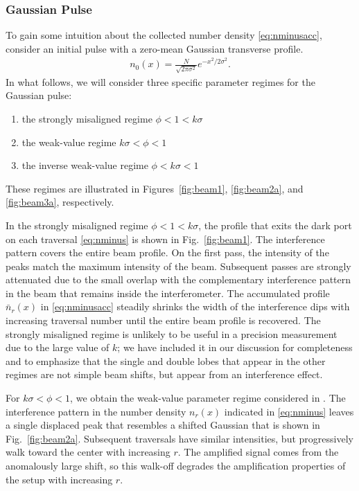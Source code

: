 \subsubsection{Gaussian Pulse}\label{sec:regimes}
To gain some intuition about the collected number density \eqref{eq:nminusacc}, consider an initial pulse with a zero-mean Gaussian transverse profile.
\begin{align}\label{eq:gaussian}
  n_0(x) = \frac{N}{\sqrt{2\pi\sigma^2}}e^{-x^2/2\sigma^2}.
\end{align}
In what follows, we will consider three specific parameter regimes for the Gaussian pulse:
\begin{enumerate}
  \item the strongly misaligned regime $\phi < 1 < k\sigma$ 
  \item the weak-value regime $k\sigma < \phi < 1$ 
  \item the inverse weak-value regime $\phi < k\sigma < 1$
\end{enumerate}
These regimes are illustrated in Figures~\ref{fig:beam1}, \ref{fig:beam2a}, and \ref{fig:beam3a}, respectively.

In the strongly misaligned regime $\phi < 1 < k\sigma$, the profile that exits the dark port on each traversal \eqref{eq:nminus} is shown in Fig.~\ref{fig:beam1}.  The interference pattern covers the entire beam profile.  On the first pass, the intensity of the peaks match the maximum intensity of the beam.  Subsequent passes are strongly attenuated due to the small overlap with the complementary interference pattern in the beam that remains inside the interferometer.  The accumulated profile $\bar{n}_r(x)$ in \eqref{eq:nminusacc} steadily shrinks the width of the interference dips with increasing traversal number until the entire beam profile is recovered.  The strongly misaligned regime is unlikely to be useful in a precision measurement due to the large value of $k$; we have included it in our discussion for completeness and to emphasize that the single and double lobes that appear in the other regimes are not simple beam shifts, but appear from an interference effect.

For $k\sigma < \phi < 1$, we obtain the weak-value parameter regime considered in \cite{Dixon2009}.  The interference pattern in the number density $n_r(x)$ indicated in \eqref{eq:nminus} leaves a single displaced peak that resembles a shifted Gaussian that is shown in Fig.~\ref{fig:beam2a}.  Subsequent traversals have similar intensities, but progressively walk toward the center with increasing $r$.  The amplified signal comes from the anomalously large shift, so this walk-off degrades the amplification properties of the setup with increasing $r$.

